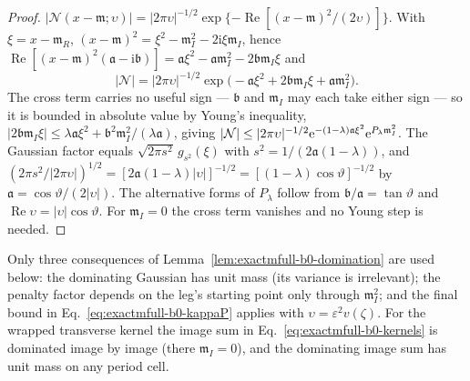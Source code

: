 \begin{proof}
\(|\mathcal N(x-\mathfrak m;\upsilon)|
=|2\pi\upsilon|^{-1/2}\exp\{-\operatorname{Re}[(x-\mathfrak m)^2/(2\upsilon)]\}\).
With \(\xi=x-\mathfrak m_R\),
\((x-\mathfrak m)^2=\xi^2-\mathfrak m_I^2-2\mathrm i\xi\mathfrak m_I\),
hence
\(\operatorname{Re}[(x-\mathfrak m)^2(\mathfrak a-\mathrm i\mathfrak b)]
=\mathfrak a\xi^2-\mathfrak a\mathfrak m_I^2
-2\mathfrak b\mathfrak m_I\xi\) and
\begin{equation*}
 |\mathcal N|
 =|2\pi\upsilon|^{-1/2}
 \exp\!\bigl(-\mathfrak a\xi^2+2\mathfrak b\mathfrak m_I\xi
 +\mathfrak a\mathfrak m_I^2\bigr).
\end{equation*}
The cross term carries no useful sign --- \(\mathfrak b\) and
\(\mathfrak m_I\) may each take either sign --- so it is bounded in absolute
value by Young's inequality,
\(|2\mathfrak b\mathfrak m_I\xi|\le\lambda\mathfrak a\xi^2
+\mathfrak b^2\mathfrak m_I^2/(\lambda\mathfrak a)\), giving
\(|\mathcal N|\le|2\pi\upsilon|^{-1/2}
\mathrm e^{-(1-\lambda)\mathfrak a\xi^2}\mathrm e^{P_\lambda\mathfrak m_I^2}\).
The Gaussian factor equals \(\sqrt{2\pi s^2}\,g_{s^2}(\xi)\) with
\(s^2=1/(2\mathfrak a(1-\lambda))\), and
\((2\pi s^2/|2\pi\upsilon|)^{1/2}
=[2\mathfrak a(1-\lambda)|\upsilon|]^{-1/2}
=[(1-\lambda)\cos\vartheta]^{-1/2}\)
by \(\mathfrak a=\cos\vartheta/(2|\upsilon|)\).  The alternative forms of
\(P_\lambda\) follow from \(\mathfrak b/\mathfrak a=\tan\vartheta\) and
\(\operatorname{Re}\upsilon=|\upsilon|\cos\vartheta\).  For
\(\mathfrak m_I=0\) the cross term vanishes and no Young step is needed.
\end{proof}

Only three consequences of Lemma~\ref{lem:exactmfull-b0-domination} are used
below: the dominating Gaussian has unit mass (its variance is irrelevant);
the penalty factor depends on the leg's starting point only through
\(\mathfrak m_I^2\); and the final bound in
Eq.~\eqref{eq:exactmfull-b0-kappaP} applies with
\(\upsilon=\varepsilon^2v(\zeta)\).  For the wrapped transverse kernel the
image sum in Eq.~\eqref{eq:exactmfull-b0-kernels} is dominated image by
image (there \(\mathfrak m_I=0\)), and the dominating image sum has unit
mass on any period cell.


